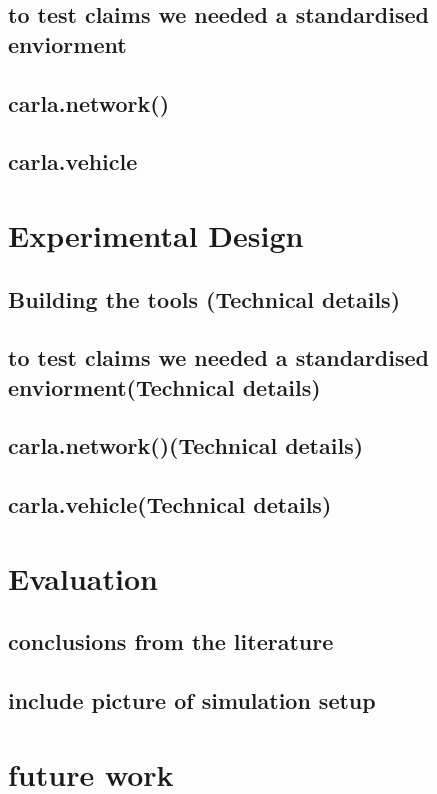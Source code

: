 \documentclass[conference]{IEEEtran}
\begin{document}
\subsection{to test claims we needed a standardised enviorment}
\subsection{carla.network()}
\subsection{carla.vehicle}




\section{Experimental Design}
\subsection{Building the tools (Technical details)}
\subsection{to test claims we needed a standardised enviorment(Technical details)}
\subsection{carla.network()(Technical details)}
\subsection{carla.vehicle(Technical details)}

\section{Evaluation}
\subsection{conclusions from the literature}
\subsection{include picture of simulation setup}

\section{future work}
\end{document}
